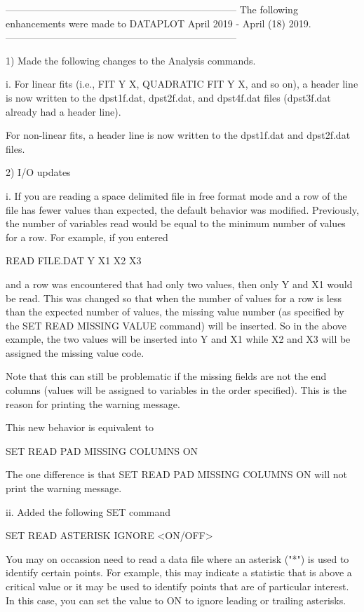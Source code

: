 -----------------------------------------------------------------------
The following enhancements were made to DATAPLOT
April 2019 - April (18) 2019.
-----------------------------------------------------------------------

 1) Made the following changes to the Analysis commands.

      i. For linear fits (i.e., FIT Y X, QUADRATIC FIT Y X, and so on), a
         header line is now written to the dpst1f.dat, dpst2f.dat, and
         dpst4f.dat files (dpst3f.dat already had a header line).

         For non-linear fits, a header line is now written to the dpst1f.dat
         and dpst2f.dat files.

 2) I/O updates

      i. If you are reading a space delimited file in free format mode
         and a row of the file has fewer values than expected, the
         default behavior was modified.  Previously, the number of
         variables read would be equal to the minimum number of values
         for a row.  For example, if you entered

             READ FILE.DAT Y X1 X2 X3

         and a row was encountered that had only two values, then only
         Y and X1 would be read.  This was changed so that when the number
         of values for a row is less than the expected number of values,
         the missing value number (as specified by the SET READ MISSING
         VALUE command) will be inserted.  So in the above example, the
         two values will be inserted into Y and X1 while X2 and X3 will be
         assigned the missing value code.

         Note that this can still be problematic if the missing fields are
         not the end columns (values will be assigned to variables in the
         order specified).  This is the reason for printing the warning
         message.

         This new behavior is equivalent to

              SET READ PAD MISSING COLUMNS ON

         The one difference is that SET READ PAD MISSING COLUMNS ON will
         not print the warning message.

     ii. Added the following SET command

            SET READ ASTERISK IGNORE <ON/OFF>

         You may on occassion need to read a data file where an asterisk
         ("*") is used to identify certain points.  For example, this may
         indicate a statistic that is above a critical value or it may
         be used to identify points that are of particular interest.  In
         this case, you can set the value to ON to ignore leading or
         trailing asterisks.

